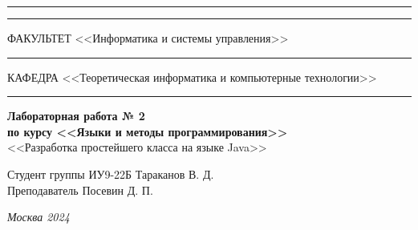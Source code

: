 \documentclass[a4paper, 14pt]{extarticle}
\begin{document}
\begin{titlepage}
\vspace{-25pt}
\hspace{-35pt}\rule{\textwidth}{2.3pt}

\vspace*{-20.3pt}
\hspace{-35pt}\rule{\textwidth}{0.4pt}

\vspace{1.5ex}
\hspace{-35pt} \noindent \small ФАКУЛЬТЕТ\hspace{80pt} <<Информатика и системы управления>>

\vspace*{-16pt}
\hspace{47pt}\rule{0.83\textwidth}{0.4pt}

\vspace{0.5ex}
\hspace{-35pt} \noindent \small КАФЕДРА\hspace{50pt} <<Теоретическая информатика и компьютерные технологии>>

\vspace*{-16pt}
\hspace{30pt}\rule{0.866\textwidth}{0.4pt}
  
\vspace{11em}

\begin{center}
\Large {\bf Лабораторная работа № 2} \\ 
\large {\bf по курсу <<Языки и методы программирования>>} \\
\large <<Разработка простейшего класса на языке Java>> 
\end{center}\normalsize

\vspace{8em}


\begin{flushright}
  {Студент группы ИУ9-22Б Тараканов В. Д. \hspace*{15pt}\\ 
  \vspace{2ex}
  Преподаватель Посевин Д. П.\hspace*{15pt}}
\end{flushright}

\bigskip

\vfill
 

\begin{center}
\textsl{Москва 2024}
\end{center}
\end{titlepage}
\end{document}
